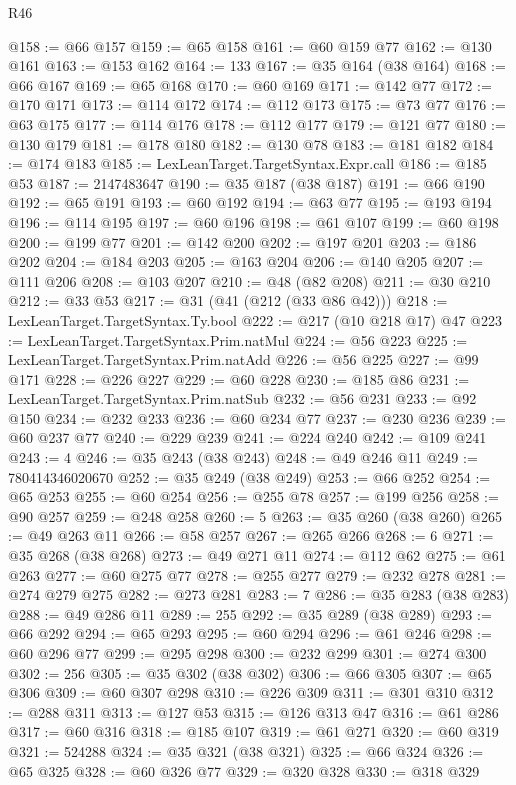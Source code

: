 \begin{lexlean}{R46}
\begin{coremodule}
@158 := @66 @157
@159 := @65 @158
@161 := @60 @159 @77
@162 := @130 @161
@163 := @153 @162
@164 := 133
@167 := @35 @164 (@38 @164)
@168 := @66 @167
@169 := @65 @168
@170 := @60 @169
@171 := @142 @77
@172 := @170 @171
@173 := @114 @172
@174 := @112 @173
@175 := @73 @77
@176 := @63 @175
@177 := @114 @176
@178 := @112 @177
@179 := @121 @77
@180 := @130 @179
@181 := @178 @180
@182 := @130 @78
@183 := @181 @182
@184 := @174 @183
@185 := LexLeanTarget.TargetSyntax.Expr.call
@186 := @185 @53
@187 := 2147483647
@190 := @35 @187 (@38 @187)
@191 := @66 @190
@192 := @65 @191
@193 := @60 @192
@194 := @63 @77
@195 := @193 @194
@196 := @114 @195
@197 := @60 @196
@198 := @61 @107
@199 := @60 @198
@200 := @199 @77
@201 := @142 @200
@202 := @197 @201
@203 := @186 @202
@204 := @184 @203
@205 := @163 @204
@206 := @140 @205
@207 := @111 @206
@208 := @103 @207
@210 := @48 (@82 @208)
@211 := @30 @210
@212 := @33 @53
@217 := @31 (@41 (@212 (@33 @86 @42)))
@218 := LexLeanTarget.TargetSyntax.Ty.bool
@222 := @217 (@10 @218 @17) @47
@223 := LexLeanTarget.TargetSyntax.Prim.natMul
@224 := @56 @223
@225 := LexLeanTarget.TargetSyntax.Prim.natAdd
@226 := @56 @225
@227 := @99 @171
@228 := @226 @227
@229 := @60 @228
@230 := @185 @86
@231 := LexLeanTarget.TargetSyntax.Prim.natSub
@232 := @56 @231
@233 := @92 @150
@234 := @232 @233
@236 := @60 @234 @77
@237 := @230 @236
@239 := @60 @237 @77
@240 := @229 @239
@241 := @224 @240
@242 := @109 @241
@243 := 4
@246 := @35 @243 (@38 @243)
@248 := @49 @246 @11
@249 := 780414346020670
@252 := @35 @249 (@38 @249)
@253 := @66 @252
@254 := @65 @253
@255 := @60 @254
@256 := @255 @78
@257 := @199 @256
@258 := @90 @257
@259 := @248 @258
@260 := 5
@263 := @35 @260 (@38 @260)
@265 := @49 @263 @11
@266 := @58 @257
@267 := @265 @266
@268 := 6
@271 := @35 @268 (@38 @268)
@273 := @49 @271 @11
@274 := @112 @62
@275 := @61 @263
@277 := @60 @275 @77
@278 := @255 @277
@279 := @232 @278
@281 := @274 @279 @275
@282 := @273 @281
@283 := 7
@286 := @35 @283 (@38 @283)
@288 := @49 @286 @11
@289 := 255
@292 := @35 @289 (@38 @289)
@293 := @66 @292
@294 := @65 @293
@295 := @60 @294
@296 := @61 @246
@298 := @60 @296 @77
@299 := @295 @298
@300 := @232 @299
@301 := @274 @300
@302 := 256
@305 := @35 @302 (@38 @302)
@306 := @66 @305
@307 := @65 @306
@309 := @60 @307 @298
@310 := @226 @309
@311 := @301 @310
@312 := @288 @311
@313 := @127 @53
@315 := @126 @313 @47
@316 := @61 @286
@317 := @60 @316
@318 := @185 @107
@319 := @61 @271
@320 := @60 @319
@321 := 524288
@324 := @35 @321 (@38 @321)
@325 := @66 @324
@326 := @65 @325
@328 := @60 @326 @77
@329 := @320 @328
@330 := @318 @329

\end{coremodule}
\end{lexlean}
